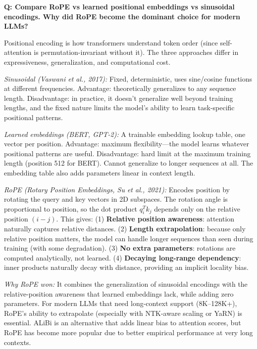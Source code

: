 \begin{interviewq}
\textbf{Q: Compare RoPE vs learned positional embeddings vs sinusoidal encodings. Why did RoPE become the dominant choice for modern LLMs?}

 \quad {} \quad \badgefreq{\freqmed}

\stronganswer Positional encoding is how transformers understand token order (since self-attention is permutation-invariant without it). The three approaches differ in expressiveness, generalization, and computational cost.

\textit{Sinusoidal (Vaswani et al., 2017):} Fixed, deterministic, uses sine/cosine functions at different frequencies. Advantage: theoretically generalizes to any sequence length. Disadvantage: in practice, it doesn't generalize well beyond training lengths, and the fixed nature limits the model's ability to learn task-specific positional patterns.

\textit{Learned embeddings (BERT, GPT-2):} A trainable embedding lookup table, one vector per position. Advantage: maximum flexibility---the model learns whatever positional patterns are useful. Disadvantage: hard limit at the maximum training length (position 512 for BERT). Cannot generalize to longer sequences at all. The embedding table also adds parameters linear in context length.

\textit{RoPE (Rotary Position Embeddings, Su et al., 2021):} Encodes position by rotating the query and key vectors in 2D subspaces. The rotation angle is proportional to position, so the dot product $q_i^T k_j$ depends only on the relative position $(i - j)$. This gives: (1) \textbf{Relative position awareness}: attention naturally captures relative distances. (2) \textbf{Length extrapolation}: because only relative position matters, the model can handle longer sequences than seen during training (with some degradation). (3) \textbf{No extra parameters}: rotations are computed analytically, not learned. (4) \textbf{Decaying long-range dependency}: inner products naturally decay with distance, providing an implicit locality bias.

\textit{Why RoPE won:} It combines the generalization of sinusoidal encodings with the relative-position awareness that learned embeddings lack, while adding zero parameters. For modern LLMs that need long-context support (8K--128K+), RoPE's ability to extrapolate (especially with NTK-aware scaling or YaRN) is essential. ALiBi is an alternative that adds linear bias to attention scores, but RoPE has become more popular due to better empirical performance at very long contexts.


\end{interviewq}
